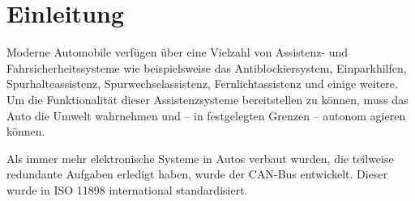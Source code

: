 
\section{Einleitung}
Moderne Automobile verfügen über eine Vielzahl von Assistenz- und
Fahrsicherheitssysteme wie beispielsweise das Antiblockiersystem,
Einparkhilfen, Spurhalteassistenz, Spurwechselassistenz, Fernlichtassistenz und
einige weitere. Um die Funktionalität dieser Assistenzsysteme bereitstellen zu
können, muss das Auto die Umwelt wahrnehmen und -- in festgelegten Grenzen --
autonom agieren können.

Als immer mehr elektronische Systeme in Autos verbaut wurden, die teilweise
redundante Aufgaben erledigt haben, wurde der CAN-Bus entwickelt\cite{Kiencke1986}.
Dieser wurde in ISO 11898 international standardisiert.